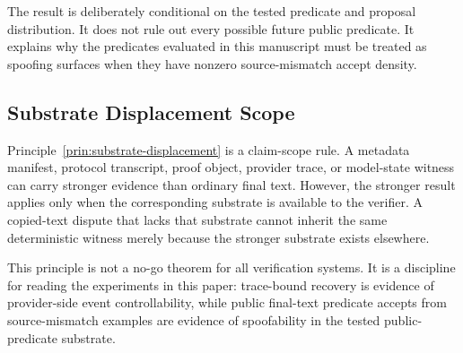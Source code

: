 The result is deliberately conditional on the tested predicate and proposal
distribution.  It does not rule out every possible future public predicate.
It explains why the predicates evaluated in this manuscript must be treated as
spoofing surfaces when they have nonzero source-mismatch accept density.

\subsection{Substrate Displacement Scope}

Principle~\ref{prin:substrate-displacement} is a claim-scope rule.  A
metadata manifest, protocol transcript, proof object, provider trace, or
model-state witness can carry stronger evidence than ordinary final text.
However, the stronger result applies only when the corresponding substrate is
available to the verifier.  A copied-text dispute that lacks that substrate
cannot inherit the same deterministic witness merely because the stronger
substrate exists elsewhere.

This principle is not a no-go theorem for all verification systems.  It is a
discipline for reading the experiments in this paper: trace-bound recovery is
evidence of provider-side event controllability, while public final-text
predicate accepts from source-mismatch examples are evidence of spoofability in
the tested public-predicate substrate.

